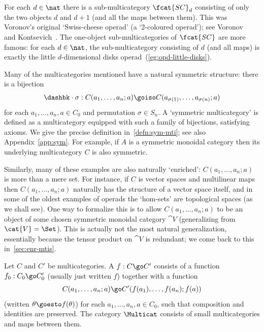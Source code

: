 \begin{example}
For each $d\in\nat$ there is a sub-multicategory $\fcat{SC}_d$ consisting
of only the two objects $d$ and $d+1$ (and all the maps between them).
This was Voronov's%
%
%
original `Swiss-cheese%
%
%
operad' (a `2-coloured operad');
see Voronov~\cite{VorSCO} and Kontsevich~\cite[2.5]{KonOMD}.%
%
%
 The
one-object sub-multicategories of $\fcat{SC}$ are more famous: for each
$d\in\nat$, the sub-multicategory consisting of $d$ (and all maps) is
exactly the little%
%
%
$d$-dimensional disks
operad~(\ref{eg:opd-little-disks}).
\end{example}


Many of the multicategories mentioned have a natural symmetric structure:
there is a bijection
\[
\dashbk\cdot\sigma:
C(a_1, \ldots, a_n; a)
\goiso
C(a_{\sigma(1)}, \ldots, a_{\sigma(n)}; a)
\]%
% 
%
% 
for each $a_1, \ldots, a_n, a \in C_0$ and permutation $\sigma\in S_n$.%
% 
% 
 A
`symmetric%
%
%
multicategory'%
%
is defined as a multicategory equipped with such a family of bijections,
satisfying axioms.  We give the precise definition in~\ref{defn:sym-mti};
see also Appendix~\ref{app:sym}.  For example, if $A$ is a symmetric
monoidal category then its underlying multicategory $C$ is also symmetric.

Similarly, many of these examples are also naturally `enriched':%
%
%
%
% 
$C(a_1, \ldots, a_n; a)$ is more than a mere set.  For instance, if $C$ is
vector spaces and multilinear maps then $C(a_1, \ldots, a_n; a)$ naturally
has the structure of a vector space itself, and in some of the oldest
examples of operads the `hom-sets' are topological spaces (as we shall
see).  One way to formalize this is to allow $C(a_1, \ldots, a_n; a)$ to be
an object of some chosen symmetric%
%
%
monoidal category $\cat{V}$ (generalizing from $\cat{V} = \Set$).  This is
actually not the most natural generalization, essentially because the
tensor product on $\cat{V}$ is redundant; we come back to this
in~\ref{sec:enr-mtis}.


\begin{defn}
Let $C$ and $C'$ be multicategories.  A  $f:
C \go C'$ consists of a function $f_0: C_0 \go C'_0$ (usually just written
$f$) together with a function
\[
C(a_1, \ldots, a_n; a) \go C'(f(a_1), \ldots, f(a_n); f(a))
\]
(written $\theta \goesto f(\theta)$) for each $a_1, \ldots, a_n, a \in
C_0$, such that composition and identities are preserved.  The category
$\Multicat$%
% 
% 
consists of small multicategories and maps between them.
\end{defn}

